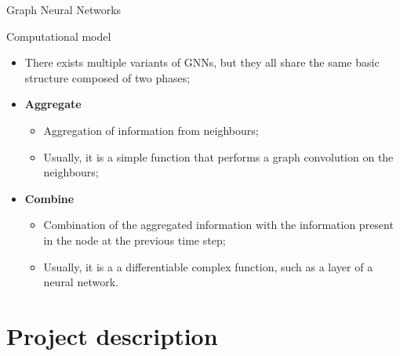 \documentclass[presentation]{beamer}\mode<presentation>{\usetheme{AMSBolognaFC}}
\begin{document}
\begin{frame}[allowframebreaks]{Graph Neural Networks}
\begin{alertblock}{Computational model}
	\begin{itemize}
		\item There exists multiple variants of GNNs, but they all share the same basic structure composed of two phases;
		\item \textbf{Aggregate}
		\begin{itemize}
			\item Aggregation of information from neighbours;
			\item Usually, it is a simple function that performs a graph convolution on the neighbours;
		\end{itemize}
		\item \textbf{Combine}
		\begin{itemize}
			\item Combination of the aggregated information with the information present in the 
				node at the previous time step;
			\item Usually, it is a a differentiable complex function, such as a layer of a neural network.
		\end{itemize}
	\end{itemize}
\end{alertblock}
	
\end{frame}



\section{Project description}
\end{document}
